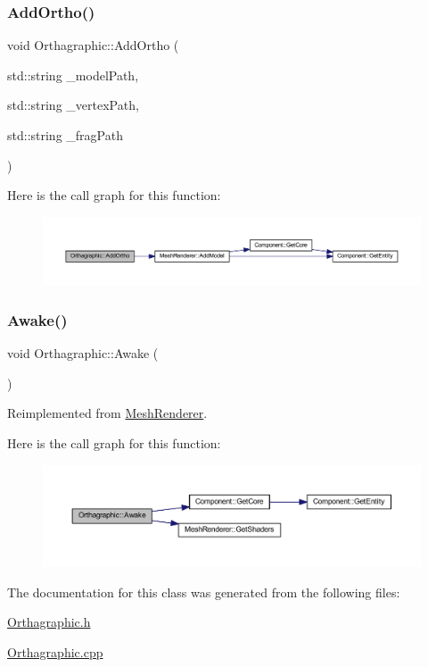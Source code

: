 \subsubsection{\texorpdfstring{Add\+Ortho()}{AddOrtho()}}
{\footnotesize\ttfamily void Orthagraphic\+::\+Add\+Ortho (\begin{DoxyParamCaption}\item[{std\+::string}]{\+\_\+model\+Path,  }\item[{std\+::string}]{\+\_\+vertex\+Path,  }\item[{std\+::string}]{\+\_\+frag\+Path }\end{DoxyParamCaption})}

Here is the call graph for this function\+:
\nopagebreak
\begin{figure}[H]
\begin{center}
\leavevmode
\includegraphics[width=350pt]{class_orthagraphic_a7566bfec317c25a115d4d0b7debfb36c_cgraph}
\end{center}
\end{figure}
\mbox{\label{class_orthagraphic_a62f9d1b5d54623252bc3d15eba1e7181}} 
\subsubsection{\texorpdfstring{Awake()}{Awake()}}
{\footnotesize\ttfamily void Orthagraphic\+::\+Awake (\begin{DoxyParamCaption}{ }\end{DoxyParamCaption})\hspace{0.3cm}{\ttfamily [virtual]}}



Reimplemented from \mbox{\hyperlink{class_mesh_renderer_a3fc0e9658d3b9a53e3559cb9b939aeb9}{Mesh\+Renderer}}.

Here is the call graph for this function\+:
\nopagebreak
\begin{figure}[H]
\begin{center}
\leavevmode
\includegraphics[width=350pt]{class_orthagraphic_a62f9d1b5d54623252bc3d15eba1e7181_cgraph}
\end{center}
\end{figure}


The documentation for this class was generated from the following files\+:\begin{DoxyCompactItemize}
\item 
\mbox{\hyperlink{_orthagraphic_8h}{Orthagraphic.\+h}}\item 
\mbox{\hyperlink{_orthagraphic_8cpp}{Orthagraphic.\+cpp}}\end{DoxyCompactItemize}
